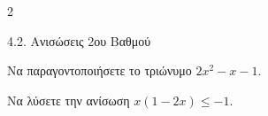 \begin{ylh}{2}
    \item 4.2. Ανισώσεις 2ου Βαθμού
\end{ylh}

\begin{alist}
\item Να παραγοντοποιήσετε το τριώνυμο $2x^{2} - x - 1$.
\item Να λύσετε την ανίσωση $x(1 - 2x) \leq - 1.$
\end{alist}

